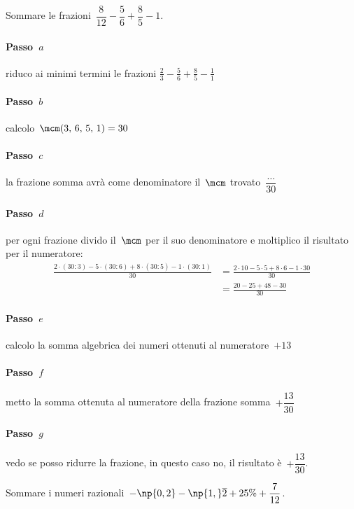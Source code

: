 \begin{exrig}
\begin{esempio}
Sommare le frazioni~$\dfrac{8}{12}-\dfrac{5}{6}+\dfrac{8}{5}-1$.

\paragraph*{Passo~$a$} riduco ai minimi termini le frazioni
$\displaystyle{\frac{2}{3}-\frac{5}{6}+\frac{8}{5}-\frac{1}{1}}$
\paragraph*{Passo~$b$} calcolo~$\mcm(3\text{,~}6\text{,~}5\text{,~}1)=30$
\paragraph*{Passo~$c$} la frazione somma avrà come denominatore il~$\mcm$ trovato~$\dfrac{\ldots}{30}$
\paragraph*{Passo~$d$} per ogni frazione divido il~$\mcm$ per il suo denominatore e moltiplico il risultato
per il numeratore:
\begin{align*}
\frac{2\cdot(30:3)-5\cdot(30:6)+8\cdot(30:5)-1\cdot(30:1)}{30}&=
\frac{2\cdot10-5\cdot5+8\cdot6-1\cdot30}{30}\\
&=\frac{20-25+48-30}{30}
\end{align*}

\paragraph*{Passo~$e$} calcolo la somma algebrica dei numeri ottenuti al numeratore~$+13$
\paragraph*{Passo~$f$} metto la somma ottenuta al numeratore della frazione somma~$+\dfrac{13}{30}$
\paragraph*{Passo~$g$} vedo se posso ridurre la frazione, in questo caso no, il risultato è~$+\dfrac{13}{30}$.
\end{esempio}

\begin{esempio}
Sommare i numeri razionali~$-\np{0,2}-\np{1,}\overline{2}+25\%+\dfrac{7}{12}$.


\end{esempio}
\end{exrig}
